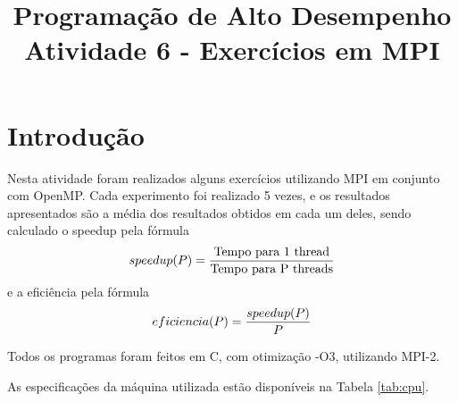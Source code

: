 \documentclass[conference]{IEEEtran}
\begin{document}
\title{Programação de Alto Desempenho\\
\large Atividade 6 - Exercícios em MPI}

\author{
 }

\maketitle


\section{Introdução}
Nesta atividade foram realizados alguns exercícios utilizando MPI em conjunto com OpenMP.
Cada experimento foi realizado 5 vezes, e os resultados apresentados são a média dos resultados obtidos em cada um deles, sendo calculado o speedup pela fórmula $$speedup(P) = {{\textrm{Tempo para 1 thread} }\over{\textrm{Tempo para P threads} }}$$ e a eficiência pela fórmula $$eficiencia(P) = {{speedup(P)}\over{P}}$$

Todos os programas foram feitos em C, com otimização -O3, utilizando MPI-2.


As especificações da máquina utilizada estão disponíveis na Tabela \ref{tab:cpu}.
\end{document}
